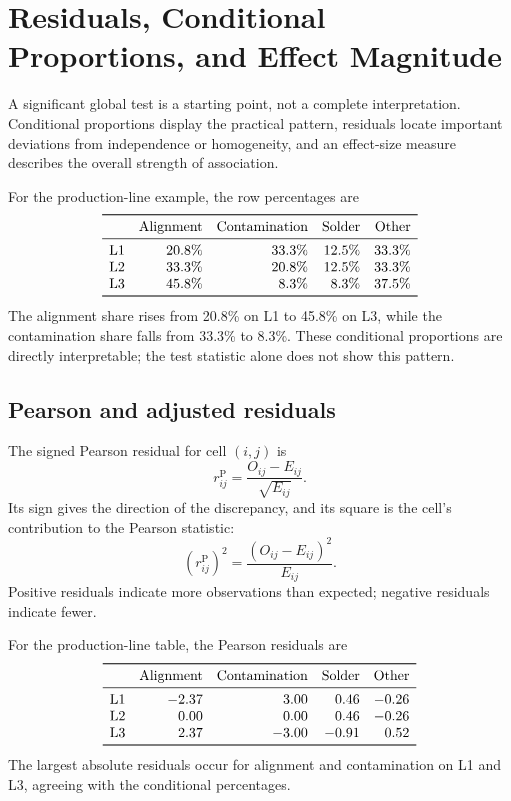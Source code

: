 \section{Residuals, Conditional Proportions, and Effect Magnitude}
\label{sec:chi-square-follow-up}

A significant global test is a starting point, not a complete interpretation. Conditional proportions display the practical pattern, residuals locate important deviations from independence or homogeneity, and an effect-size measure describes the overall strength of association.

For the production-line example, the row percentages are
\[
\begin{array}{lrrrr}
\toprule
 & \text{Alignment} & \text{Contamination} & \text{Solder} & \text{Other}\\
\midrule
\text{L1} & 20.8\% & 33.3\% & 12.5\% & 33.3\%\\
\text{L2} & 33.3\% & 20.8\% & 12.5\% & 33.3\%\\
\text{L3} & 45.8\% &  8.3\% &  8.3\% & 37.5\%\\
\bottomrule
\end{array}
\]
The alignment share rises from 20.8\% on L1 to 45.8\% on L3, while the contamination share falls from 33.3\% to 8.3\%. These conditional proportions are directly interpretable; the test statistic alone does not show this pattern.

\subsection{Pearson and adjusted residuals}

The signed Pearson residual for cell $(i,j)$ is
\[
r^{\mathrm{P}}_{ij}
=\frac{O_{ij}-E_{ij}}{\sqrt{E_{ij}}}.
\]
Its sign gives the direction of the discrepancy, and its square is the cell's contribution to the Pearson statistic:
\[
\left(r^{\mathrm{P}}_{ij}\right)^2
=\frac{(O_{ij}-E_{ij})^2}{E_{ij}}.
\]
Positive residuals indicate more observations than expected; negative residuals indicate fewer.

For the production-line table, the Pearson residuals are
\[
\begin{array}{lrrrr}
\toprule
 & \text{Alignment} & \text{Contamination} & \text{Solder} & \text{Other}\\
\midrule
\text{L1} & -2.37 &  3.00 &  0.46 & -0.26\\
\text{L2} &  0.00 &  0.00 &  0.46 & -0.26\\
\text{L3} &  2.37 & -3.00 & -0.91 &  0.52\\
\bottomrule
\end{array}
\]
The largest absolute residuals occur for alignment and contamination on L1 and L3, agreeing with the conditional percentages.

